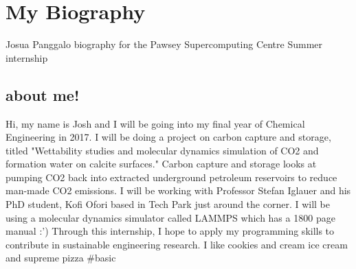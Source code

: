 \section{My Biography}
Josua Panggalo biography for the Pawsey Supercomputing Centre Summer internship
\subsection{about me!}
Hi, my name is Josh and I will be going into my final year of Chemical Engineering in 2017. I will be doing a project on carbon capture and storage, titled "Wettability studies and molecular dynamics simulation of CO2 and formation water on calcite surfaces." Carbon capture and storage looks at pumping CO2 back into extracted underground petroleum reservoirs to reduce man-made CO2 emissions. I will be working with Professor Stefan Iglauer and his PhD student, Kofi Ofori based in Tech Park just around the corner. I will be using a molecular dynamics simulator called LAMMPS which has a 1800 page manual :') Through this internship, I hope to apply my programming skills to contribute in sustainable engineering research. I like cookies and cream ice cream and supreme pizza #basic

